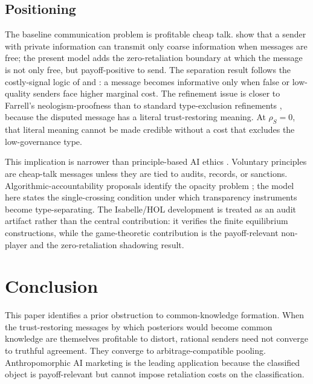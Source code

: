 \documentclass[preprint,authoryear]{elsarticle}
\theoremstyle{definition}
\theoremstyle{plain}
\begin{document}
\subsection{Positioning}
\label{subsec:positioning}

The baseline communication problem is profitable cheap talk.  \citet{crawford_sobel1982}
show that a sender with private information can transmit only coarse information
when messages are free; the present model adds the zero-retaliation boundary at which the message is not only free, but payoff-positive to send.  The separation result follows the costly-signal logic
of \citet{spence1973} and \citet{milgrom_roberts1986}: a message becomes
informative only when false or low-quality senders face higher marginal cost.
The refinement issue is closer to Farrell's neologism-proofness
\citep{farrell1993} than to standard type-exclusion refinements
\citep{cho_kreps1987,banks_sobel1987}, because the disputed message has a
literal trust-restoring meaning.  At $\rho_S=0$, that literal meaning cannot be
made credible without a cost that excludes the low-governance type.

This implication is narrower than principle-based AI ethics
\citep{floridi2018ai4people,jobin2019global}.  Voluntary principles are
cheap-talk messages unless they are tied to audits, records, or
sanctions.  Algorithmic-accountability proposals identify the opacity problem
\citep{pasquale2015}; the model here states the single-crossing condition under
which transparency instruments become type-separating.  The Isabelle/HOL
development is treated as an audit artifact rather than the central
contribution: it verifies the finite equilibrium constructions, while the
game-theoretic contribution is the payoff-relevant non-player and the
zero-retaliation shadowing result.

\section{Conclusion}
\label{sec:conclusion}

This paper identifies a prior obstruction to common-knowledge formation.  When the trust-restoring messages by which posteriors would become common knowledge are themselves profitable to distort, rational senders need not converge to truthful agreement.  They converge to arbitrage-compatible pooling.  Anthropomorphic AI marketing is the leading application because the classified object is payoff-relevant but cannot impose retaliation costs on the classification.
\end{document}

